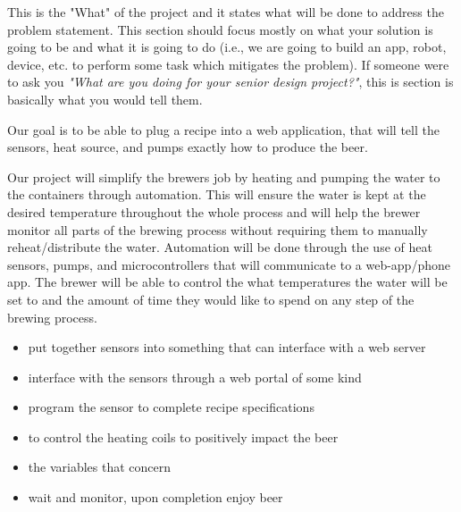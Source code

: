 This is the "What" of the project and it states what will be done to address the problem statement. This section should focus mostly on what your solution is going to be and what it is going to do (i.e., we are going to build an app, robot, device, etc. to perform some task which mitigates the problem). If someone were to ask you \textit{"What are you doing for your senior design project?"}, this is section is basically what you would tell them.


\vspace{5mm}

Our goal is to be able to plug a recipe into a web application, that will tell the sensors, heat source, and pumps exactly how to produce the beer. 

\vspace{5mm}

Our project will simplify the brewers job by heating and pumping the water to the containers through automation. This will
ensure the water is kept at the desired temperature throughout the whole process and will help the brewer monitor all
parts of the brewing process without requiring them to manually reheat/distribute the water. Automation will be done through the use of heat sensors, pumps, and microcontrollers that will communicate to a web-app/phone app.
The brewer will be able to
control the what temperatures the water will be set to and the amount of time they would like to spend on any step of the brewing process.

\begin{itemize}
  
  \item put together sensors into something that can interface with a web server
  \item interface with the sensors through a web portal of some kind
  \item program the sensor to complete recipe specifications
  \item to control the heating coils to positively impact the beer
  \item the variables that concern
   
  \item wait and monitor, upon completion enjoy beer

\end{itemize}